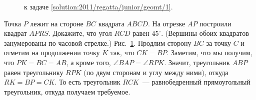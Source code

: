 \ifsolution
\begin{figure}\centering
    \caption{к задаче \ref{solution:2011/regatta/junior/geomt/1}.}
    \label{fig:solution:2011/regatta/junior/geomt/1}
\end{figure}
\fi %

\problem
Точка $P$ лежит на стороне $BC$ квадрата $ABCD$.
На отрезке $AP$ построили квадрат $APRS$.
Докажите, что угол $RCD$ равен $45^\circ$.
(Вершины обоих квадратов занумерованы по часовой стрелке.)
\solution
\label{solution:2011/regatta/junior/geomt/1}%
Рис.~\ref{fig:solution:2011/regatta/junior/geomt/1}.
Продлим сторону $BC$ за точку $C$ и отметим на продолжении точку $K$ так, что
$C K = B P$.
Заметим, что мы получим, что $PK = BC = AB$, а кроме того,
$\angle BAP = \angle RPK$.
Значит, треугольник $ABP$ равен треугольнику $RPK$
(по двум сторонам и углу между ними),
откуда $RK = BP = CK$.
То есть треугольник $RCK$~--- равнобедренный прямоугольный треугольник, откуда
получаем требуемое.
\endproblem
